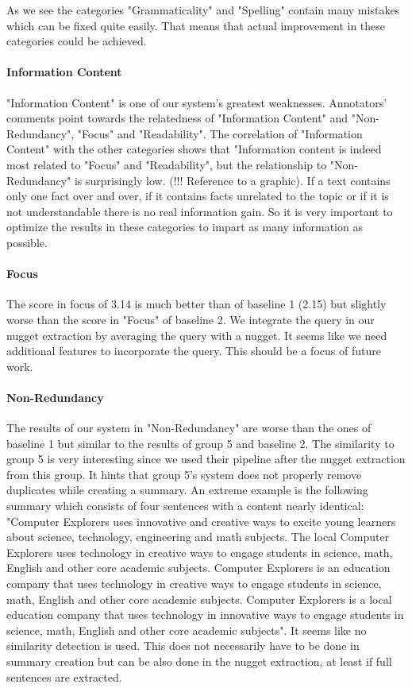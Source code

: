 As we see the categories "Grammaticality" and "Spelling" contain many mistakes which can be fixed quite easily. That means that actual improvement in these categories could be achieved.

\paragraph{Information Content}
"Information Content" is one of our system's greatest weaknesses. Annotators' comments point towards the relatedness of "Information Content" and "Non-Redundancy", "Focus" and "Readability". The correlation of "Information Content" with the other categories shows that "Information content is indeed most related to "Focus" and "Readability", but the relationship to "Non-Redundancy" is surprisingly low. (!!! Reference to a graphic). If a text contains only one fact over and over, if it contains facts unrelated to the topic or if it is not understandable there is no real information gain. So it is very important to optimize the results in these categories to impart as many information as possible.

\paragraph{Focus}
The score in focus of 3.14 is much better than of baseline 1 (2.15) but slightly worse than the score in "Focus" of baseline 2. We integrate the query in our nugget extraction by averaging the query with a nugget. It seems like we need additional features to incorporate the query. This should be a focus of future work.

\paragraph{Non-Redundancy}
The results of our system in "Non-Redundancy" are worse than the ones of baseline 1 but similar to the results of group 5 and baseline 2. The similarity to group 5 is very interesting since we used their pipeline after the nugget extraction from this group. It hints that group 5's system does not properly remove duplicates while creating a summary. An extreme example is the following summary which consists of four sentences with a content nearly identical: "Computer Explorers uses innovative and creative ways to excite young learners about science, technology, engineering and math subjects. The local Computer Explorers uses technology in creative ways to engage students in science, math, English and other core academic subjects. Computer Explorers is an education company that uses technology in creative ways to engage students in science, math, English and other core academic subjects. Computer Explorers is a local education company that uses technology in innovative ways to engage students in science, math, English and other core academic subjects". It seems like no similarity detection is used. This does not necessarily have to be done in summary creation but can be also done in the nugget extraction, at least if full sentences are extracted.

